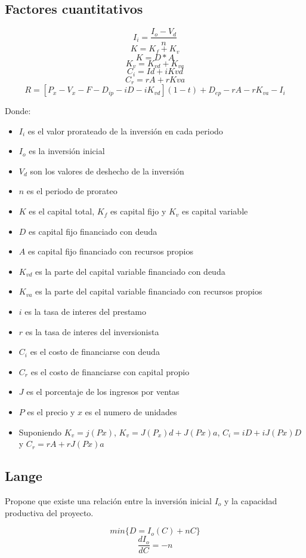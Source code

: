 \documentclass[a4paper, 11pt, oneside]{article}
\begin{document}
\subsection{Factores cuantitativos}

	\[I_i=\frac{I_o-V_d}{n}\]
	\[K=K_f+K_v\]
	\[K=D*A\]
	\[K_v=K_{vd} + K_{va}\]
	\[C_i=Id + iK{vd}\]
	\[C_r=rA + rKva \]
	\[R=[P_x-V_x-F-D_{ip}-iD-iK_{vd}](1-t) + D_{ep} - rA - rK_{va} - I_i \]

Donde:

\begin{itemize}
	\item $I_i$ es el valor prorateado de la inversión en cada periodo
	\item $I_o$ es la inversión inicial
	\item $V_d$ son los valores de deshecho de la inversión
	\item $n$ es el periodo de prorateo
	\item $K$ es el capital total, $K_f$ es capital fijo y $K_v$ es capital variable
	\item $D$ es capital fijo financiado con deuda
	\item $A$ es capital fijo financiado con recursos propios
	\item $K_{vd}$ es la parte del capital variable financiado con deuda
	\item $K_{va}$ es la parte del capital variable financiado con recursos propios
	\item $i$ es la tasa de interes del prestamo
	\item $r$ es la tasa de interes del inversionista
	\item $C_i$ es el costo de financiarse con deuda
	\item $C_r$ es el costo de financiarse con capital propio
	\item $J$ es el porcentaje de los ingresos por ventas
	\item $P$ es el precio y $x$ es el numero de unidades
	\item Suponiendo $K_v=j(Px)$, $K_v=J(P_x)d+J(Px)a$, $C_i=iD+iJ(Px)D$ y
	$C_r=rA+rJ(Px)a$
\end{itemize}

\subsection{Lange}
Propone que existe una relación entre la inversión inicial $I_o$ y la capacidad productiva del
proyecto.

	\[min\{D=I_o(C)+nC\}\]
	\[\frac{dI_o}{dC}=-n\]
\end{document}
